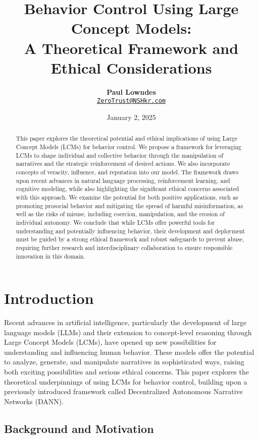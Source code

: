 \documentclass[12pt, a4paper]{article}
\title{\vspace{-2cm}\textbf{Behavior Control Using Large Concept Models: \\ A Theoretical Framework and Ethical Considerations}}
\author{\textbf{Paul Lowndes} \\ \href{mailto:ZeroTrust@NSHkr.com}{\texttt{ZeroTrust@NSHkr.com}}}
\date{\small January 2, 2025}
\begin{document}
\maketitle
\vspace{-1.5em} 


 

\begin{abstract}
This paper explores the theoretical potential and ethical implications of using Large Concept Models (LCMs) for behavior control. We propose a framework for leveraging LCMs to shape individual and collective behavior through the manipulation of narratives and the strategic reinforcement of desired actions. We also incorporate concepts of veracity, influence, and reputation into our model. The framework draws upon recent advances in natural language processing, reinforcement learning, and cognitive modeling, while also highlighting the significant ethical concerns associated with this approach. We examine the potential for both positive applications, such as promoting prosocial behavior and mitigating the spread of harmful misinformation, as well as the risks of misuse, including coercion, manipulation, and the erosion of individual autonomy. We conclude that while LCMs offer powerful tools for understanding and potentially influencing behavior, their development and deployment must be guided by a strong ethical framework and robust safeguards to prevent abuse, requiring further research and interdisciplinary collaboration to ensure responsible innovation in this domain.
\end{abstract}

\section{Introduction}

Recent advances in artificial intelligence, particularly the development of large language models (LLMs) and their extension to concept-level reasoning through Large Concept Models (LCMs), have opened up new possibilities for understanding and influencing human behavior. These models offer the potential to analyze, generate, and manipulate narratives in sophisticated ways, raising both exciting possibilities and serious ethical concerns. This paper explores the theoretical underpinnings of using LCMs for behavior control, building upon a previously introduced framework called Decentralized Autonomous Narrative Networks (DANN).

\subsection{Background and Motivation}
\end{document}
